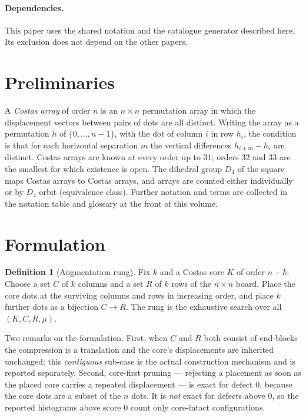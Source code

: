 \documentclass[11pt,a4paper,oneside]{report}
\theoremstyle{definition}
\newtheorem{definition}[theorem]{Definition}
\begin{document}
\paragraph{Dependencies.} This paper uses the shared notation and the catalogue generator described here. Its exclusion does not depend on the other papers.

\section{Preliminaries}\label{p2-sec:notation}
A \emph{Costas array} of order $n$ is an $n\times n$ permutation array in which the displacement
vectors between pairs of dots are all distinct. Writing the array as a permutation $h$ of
$\{0,\dots,n-1\}$, with the dot of column $i$ in row $h_i$, the condition is that for each
horizontal separation $m$ the vertical differences $h_{i+m}-h_i$ are distinct. Costas arrays are
known at every order up to 31; orders 32 and 33 are the smallest for which existence is open. The
dihedral group $D_4$ of the square maps Costas arrays to Costas arrays, and arrays are counted
either individually or by $D_4$ orbit (equivalence class). Further notation and terms are collected
in the notation table and glossary at the front of this volume.

\section{Formulation}

\begin{definition}[Augmentation rung]
Fix $k$ and a Costas core $K$ of order $n-k$. Choose a set $C$ of $k$ columns
and a set $R$ of $k$ rows of the $n\times n$ board. Place the core dots at the
surviving columns and rows in increasing order, and place $k$ further dots as a
bijection $C\to R$. The rung is the exhaustive search over all
$(K,C,R,\mu)$.
\end{definition}

Two remarks on the formulation. First, when $C$ and $R$ both consist of
end-blocks the compression is a translation and the core's displacements are
inherited unchanged; this \emph{contiguous} sub-case is the actual construction
mechanism and is reported separately. Second, core-first pruning --- rejecting a
placement as soon as the placed core carries a repeated displacement --- is
exact for defect 0, because the core dots are a subset of the $n$ dots. It is
\emph{not} exact for defects above 0, so the reported histograms above score 0
count only core-intact configurations.
\end{document}
